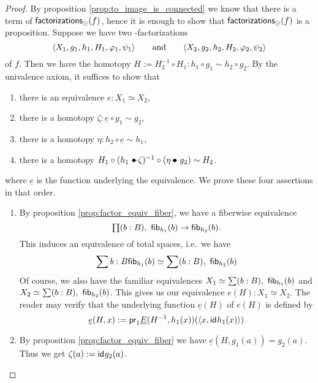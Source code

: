 \begin{proof}
By proposition \ref{prop:to_image_is_connected} we know that there is a term of $\mathsf{factorizations}_{\odot}(f)$, hence it is enough to
show that $\mathsf{factorizations}_{\odot}(f)$ is a proposition. Suppose we have two \modal-factorizations
\begin{equation*}
{\langle X_1,g_1,h_1,H_1,\varphi_1,\psi_1\rangle}\qquad\text{and}\qquad{\langle X_2,g_2,h_2,H_2,\varphi_2,\psi_2\rangle}
\end{equation*}
of $f$. Then we have the homotopy $H:=H_2^{-1}\circ H_1:h_1\circ g_1\sim h_2\circ g_2$. By the univalence axiom, it suffices to show that
\begin{enumerate}
\item there is an equivalence $e:X_1\simeq X_2$,
\item there is a homotopy $\zeta:\underline{e}\circ g_1\sim g_2$,
\item there is a homotopy $\eta:h_2\circ\underline{e}\sim h_1$,
\item there is a homotopy $H_1 \circ(h_1\leftwhisker\zeta)^{-1}\circ(\eta\rightwhisker g_2)\sim H_2$.
\end{enumerate}
where $\underline{e}$ is the function underlying the equivalence. We prove these four assertions in that order.
\begin{enumerate}
\item By proposition \ref{prop:factor_equiv_fiber}, we have a fiberwise equivalence
\begin{equation*}
\prd{b:B} \hfib{h_1}b\to\hfib{h_2}b.
\end{equation*}
This induces an equivalence of total spaces, i.e.\ we have
\begin{equation*}
\sum{b:B} \mathsf{fib}_{h_1}(b)\simeq\sum(b:B),\ \mathsf{fib}_{h_2}(b)
\end{equation*}
Of course, we also have the familiar equivalences $X_1\simeq\sum(b:B),\ \mathsf{fib}_{h_1}(b)$ and $X_2\simeq\sum(b:B),\
\mathsf{fib}_{h_2}(b)$. This gives us our equivalence $e(H):X_1\simeq X_2$. The reader may verify that the underlying function
$\underline{e}(H)$ of $e(H)$ is defined by
\begin{equation*}
\underline{e}(H,x):=\mathsf{pr}_{1}\underline{E}(H^{-1},h_1(x))({\langle x,\mathsf{id}_{}{h_1(x)}\rangle})
\end{equation*}
\item By proposition \ref{prop:factor_equiv_fiber} we have $\underline{e}(H,g_1(a))=g_2(a)$. Thus we get $\zeta(a):=\mathsf{id}_{}{g_2(a)}$. 

\end{enumerate}
\end{proof}
